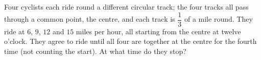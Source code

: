 Four cyclists each ride round a different circular track; the four tracks all pass through a common point, the centre, and each track is $\dfrac{1}{3}$ of a mile round. They ride at $6$, $9$, $12$ and $15$ miles per hour, all starting from the centre at twelve o'clock. They agree to ride until all four are together at the centre for the fourth time (not counting the start). At what time do they stop?

